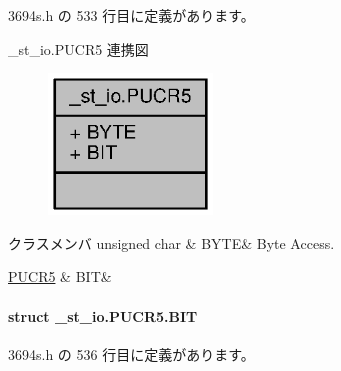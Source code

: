  3694s.\+h の 533 行目に定義があります。



\+\_\+st\+\_\+io.\+P\+U\+C\+R5 連携図
\nopagebreak
\begin{figure}[H]
\begin{center}
\leavevmode
\includegraphics[width=124pt]{d0/ddc/union__st__io_8PUCR5__coll__graph}
\end{center}
\end{figure}
\begin{DoxyFields}{クラスメンバ}
unsigned char\label{3694s_8h_ae409eb2ba6eb6801f52763ae370c350e}
&
B\+Y\+T\+E&
Byte Access. \\
\hline

\hyperlink{3694s_8h_d1/da6/struct__st__io_8PUCR5_8BIT}{P\+U\+C\+R5}\label{3694s_8h_adb957fdc8000e1eef04a243f5199aa52}
&
B\+I\+T&
\\
\hline

\end{DoxyFields}
\label{struct__st__io_8PUCR5_8BIT}
\paragraph{struct \+\_\+st\+\_\+io.\+P\+U\+C\+R5.\+B\+I\+T}


 3694s.\+h の 536 行目に定義があります。




